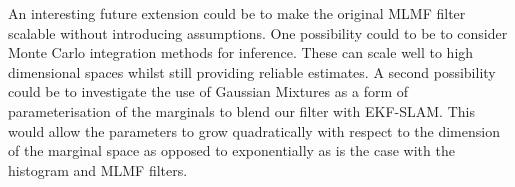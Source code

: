 An interesting future extension could be to make the original MLMF filter scalable without introducing assumptions.
One possibility could to be to consider Monte Carlo integration methods for inference. These can scale well to high dimensional 
spaces whilst still providing reliable estimates. A second possibility could be to investigate the use of Gaussian Mixtures as a 
form of parameterisation of the marginals to blend our filter with EKF-SLAM. This would allow the parameters 
to grow quadratically with respect to the dimension of the marginal space as opposed to exponentially as is the case 
with the histogram and MLMF filters.






